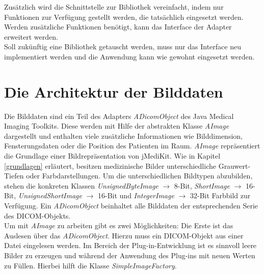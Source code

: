 Zusätzlich wird die Schnittstelle zur Bibliothek vereinfacht, indem nur Funktionen zur Verfügung gestellt werden, die tatsächlich eingesetzt werden. Werden zusätzliche Funktionen benötigt, kann das Interface der Adapter erweitert werden.\\
Soll zukünftig eine Bibliothek getauscht werden, muss nur das Interface neu implementiert werden und die Anwendung kann wie gewohnt eingesetzt werden.

\FloatBarrier
\section{Die Architektur der Bilddaten}

Die Bilddaten sind ein Teil des Adapters \textit{ADicomObject} des Java Medical Imaging Toolkits. Diese werden mit Hilfe der abstrakten Klasse \textit{AImage} dargestellt und enthalten viele zusätzliche Informationen wie Bilddimension, Fensterungsdaten oder die Position des Patienten im Raum. \textit{AImage} repräsentiert die Grundlage einer Bildrepräsentation von jMediKit. Wie in Kapitel \ref{grundlagen} erläutert, besitzen medizinische Bilder unterschiedliche Grauwert-Tiefen oder Farbdarstellungen. Um die unterschiedlichen Bildtypen abzubilden, stehen die konkreten Klassen \textit{UnsignedByteImage} $\rightarrow$ 8-Bit, \textit{ShortImage} $\rightarrow$ 16-Bit, \textit{UnsignedShortImage} $\rightarrow$ 16-Bit und \textit{IntegerImage} $\rightarrow$ 32-Bit Farbbild zur Verfügung. Ein \textit{ADicomObject} beinhaltet alle Bilddaten der entsprechenden Serie des DICOM-Objekts.\\
Um mit \textit{AImage} zu arbeiten gibt es zwei Möglichkeiten: Die Erste ist das Auslesen über das \textit{ADicomObject}. Hierzu muss ein DICOM-Objekt aus einer Datei eingelesen werden. Im Bereich der Plug-in-Entwicklung ist es sinnvoll leere Bilder zu erzeugen und während der Anwendung des Plug-ins mit neuen Werten zu Füllen. Hierbei hilft die Klasse \textit{SimpleImage\-Factory}.

